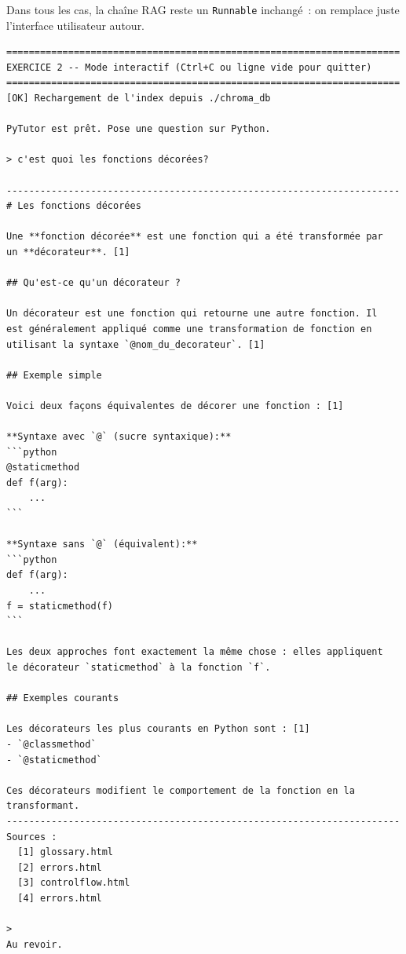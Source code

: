 \documentclass[11pt,a4paper]{article}
\begin{document}
Dans tous les cas, la chaîne RAG reste un \texttt{Runnable} inchangé~:
on remplace juste l'interface utilisateur autour.

\begin{tcolorbox}[
  colback=white,
  colframe=black!50,
  coltitle=black,
  fonttitle=\footnotesize\bfseries,
  fontupper=\footnotesize,
  title=Sortie de l'exécution,
  breakable,
]
\begin{verbatim}
======================================================================
EXERCICE 2 -- Mode interactif (Ctrl+C ou ligne vide pour quitter)
======================================================================
[OK] Rechargement de l'index depuis ./chroma_db

PyTutor est prêt. Pose une question sur Python.

> c'est quoi les fonctions décorées?

----------------------------------------------------------------------
# Les fonctions décorées

Une **fonction décorée** est une fonction qui a été transformée par
un **décorateur**. [1]

## Qu'est-ce qu'un décorateur ?

Un décorateur est une fonction qui retourne une autre fonction. Il
est généralement appliqué comme une transformation de fonction en
utilisant la syntaxe `@nom_du_decorateur`. [1]

## Exemple simple

Voici deux façons équivalentes de décorer une fonction : [1]

**Syntaxe avec `@` (sucre syntaxique):**
```python
@staticmethod
def f(arg):
    ...
```

**Syntaxe sans `@` (équivalent):**
```python
def f(arg):
    ...
f = staticmethod(f)
```

Les deux approches font exactement la même chose : elles appliquent
le décorateur `staticmethod` à la fonction `f`.

## Exemples courants

Les décorateurs les plus courants en Python sont : [1]
- `@classmethod`
- `@staticmethod`

Ces décorateurs modifient le comportement de la fonction en la
transformant.
----------------------------------------------------------------------
Sources :
  [1] glossary.html
  [2] errors.html
  [3] controlflow.html
  [4] errors.html

>
Au revoir.
\end{verbatim}
\end{tcolorbox}
\end{document}
